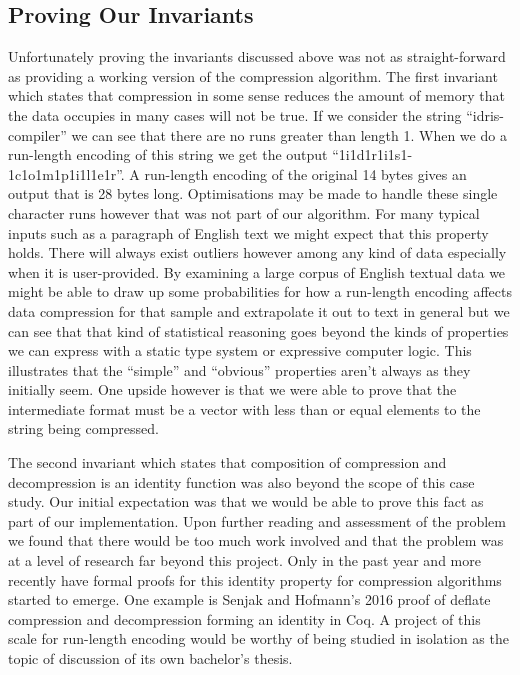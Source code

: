 \documentclass[a4paper, notitlepage]{report}
\begin{document}
\subsection{Proving Our Invariants}
\label{sec:org71fdcab}
Unfortunately proving the invariants discussed above was not as straight-forward
as providing a working version of the compression algorithm. The first invariant
which states that compression in some sense reduces the amount of memory that
the data occupies in many cases will not be true. If we consider the string
``idris-compiler'' we can see that there are no runs greater than length 1. When
we do a run-length encoding of this string we get the output
``1i1d1r1i1s1-1c1o1m1p1i1l1e1r''. A run-length encoding of the original 14 bytes
gives an output that is 28 bytes long. Optimisations may be made to handle these
single character runs however that was not part of our algorithm. For many
typical inputs such as a paragraph of English text we might expect that this
property holds. There will always exist outliers however among any kind of data
especially when it is user-provided. By examining a large corpus of English
textual data we might be able to draw up some probabilities for how a run-length
encoding affects data compression for that sample and extrapolate it out to text
in general but we can see that that kind of statistical reasoning goes beyond
the kinds of properties we can express with a static type system or expressive
computer logic. This illustrates that the ``simple'' and ``obvious'' properties
aren't always as they initially seem. One upside however is that we were able to
prove that the intermediate format must be a vector with less than or equal
elements to the string being compressed.

The second invariant which states that composition of compression and
decompression is an identity function was also beyond the scope of this case
study. Our initial expectation was that we would be able to prove this fact as
part of our implementation. Upon further reading and assessment of the problem
we found that there would be too much work involved and that the problem was at
a level of research far beyond this project. Only in the past year and more
recently have formal proofs for this identity property for compression
algorithms started to emerge. One example is Senjak and Hofmann's 2016 proof
\cite{senjak_deflate_2016} of deflate compression and decompression forming an
identity in Coq. A project of this scale for run-length encoding would be worthy
of being studied in isolation as the topic of discussion of its own bachelor's
thesis.
\end{document}
